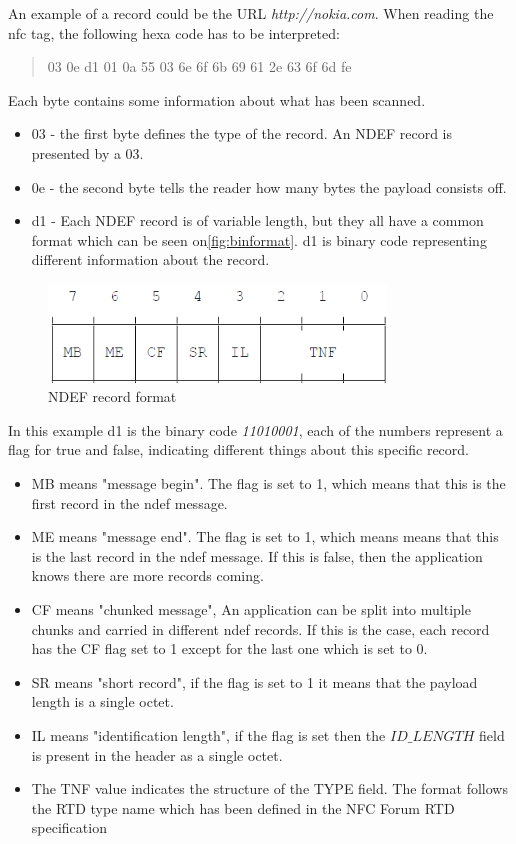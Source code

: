 An example of a record could be the URL \textit{http://nokia.com}. When reading the \ac{nfc} tag, the following hexa code has to be interpreted: 

\begin{quote}
03 0e d1 01 0a 55 03 6e 6f 6b 69 61 2e 63 6f 6d fe
\end{quote}

Each byte contains some information about what has been scanned.

\begin{itemize}
\item 03 - the first byte defines the type of the record. An NDEF record is presented by a 03.
\item 0e - the second byte tells the reader how many bytes the payload consists off.
\item d1 - Each NDEF record is of variable length, but they all have a common format which can be seen on\autoref{fig:binformat}. d1 is binary code representing different information about the record. \citep{ndef}
\end{itemize}

\begin{figure}[H]
\centering
\includegraphics[width=0.8\textwidth]{img/binformat.png}
\caption{NDEF record format\citep{ndef}}
\label{fig:binformat}
\end{figure}

In this example d1 is the binary code \textit{11010001}, each of the numbers represent a flag for true and false, indicating different things about this specific record. 

\begin{itemize}
\item MB means "message begin". The flag is set to 1, which means that this is the first record in the \ac{ndef} message.
\item ME means "message end". The flag is set to 1, which means means that this is the last record in the \ac{ndef} message. If this is false, then the application knows there are more records coming.
\item CF means "chunked message", An application can be split into multiple chunks and carried in different \ac{ndef} records. If this is the case, each record has the CF flag set to 1 except for the last one which is set to 0.
\item SR means "short record", if the flag is set to 1 it means that the payload length is a single octet. 
\item IL means "identification length", if the flag is set then the $ID\_LENGTH$ field is present in the header as a single octet. 
\item The TNF value indicates the structure of the TYPE field. The format follows the RTD type name which has been defined in the NFC Forum RTD specification\citep{ndef}
\end{itemize}

